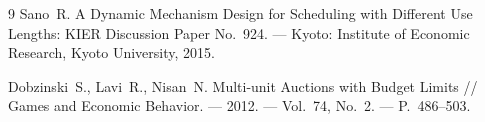 \documentclass[14pt, oneside]{extbook}
\begin{document}
\begin{thebibliography}{9}
        Sano~R. A Dynamic Mechanism Design for Scheduling with Different
        Use Lengths: KIER Discussion Paper No.~924. --- Kyoto: Institute
        of Economic Research, Kyoto University, 2015.

        Dobzinski~S., Lavi~R., Nisan~N. Multi-unit Auctions with Budget
        Limits // Games and Economic Behavior. --- 2012. ---
        Vol.~74, No.~2. --- P.~486--503.

\end{thebibliography}
\end{document}
